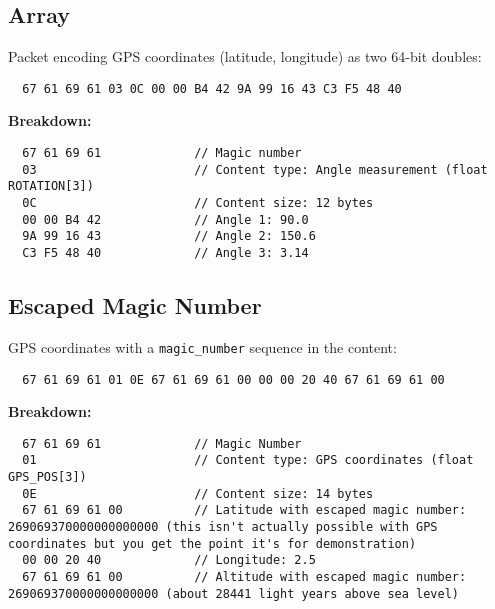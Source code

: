 \documentclass[a4paper]{article}
\begin{document}
\subsection{Array}
Packet encoding GPS coordinates (latitude, longitude) as two 64-bit doubles:
\begin{verbatim}
  67 61 69 61 03 0C 00 00 B4 42 9A 99 16 43 C3 F5 48 40
\end{verbatim}
\textbf{Breakdown:}
\begin{verbatim}
  67 61 69 61             // Magic number
  03                      // Content type: Angle measurement (float ROTATION[3])
  0C                      // Content size: 12 bytes
  00 00 B4 42             // Angle 1: 90.0
  9A 99 16 43             // Angle 2: 150.6
  C3 F5 48 40             // Angle 3: 3.14
\end{verbatim}

\subsection{Escaped Magic Number}
GPS coordinates with a \texttt{magic\_number} sequence in the content:
\begin{verbatim}
  67 61 69 61 01 0E 67 61 69 61 00 00 00 20 40 67 61 69 61 00
\end{verbatim}
\textbf{Breakdown:}
\begin{verbatim}
  67 61 69 61             // Magic Number
  01                      // Content type: GPS coordinates (float GPS_POS[3])
  0E                      // Content size: 14 bytes
  67 61 69 61 00          // Latitude with escaped magic number: 269069370000000000000 (this isn't actually possible with GPS coordinates but you get the point it's for demonstration)
  00 00 20 40             // Longitude: 2.5
  67 61 69 61 00          // Altitude with escaped magic number: 269069370000000000000 (about 28441 light years above sea level)
\end{verbatim}
\end{document}
